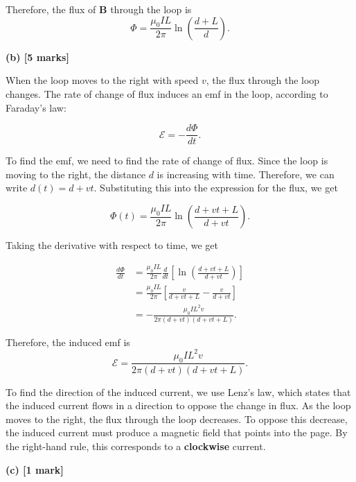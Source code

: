 \documentclass{article}
\begin{document}
Therefore, the flux of $\mathbf{B}$ through the loop is 
\begin{equation*}
\boxed{\Phi = \frac{\mu_0 I L}{2 \pi} \ln \left( \frac{d+L}{d} \right)}.
\end{equation*}

\textbf{(b) [5 marks]}

When the loop moves to the right with speed $v$, the flux through the loop changes.  The rate of change of flux induces an emf in the loop, according to Faraday's law:

\begin{equation*}
\mathcal{E} = -\frac{d\Phi}{dt}.
\end{equation*}

To find the emf, we need to find the rate of change of flux. Since the loop is moving to the right, the distance $d$ is increasing with time. Therefore, we can write $d(t) = d + vt$.  Substituting this into the expression for the flux, we get

\begin{equation*}
\Phi(t) = \frac{\mu_0 I L}{2 \pi} \ln \left( \frac{d + vt + L}{d + vt} \right).
\end{equation*}

Taking the derivative with respect to time, we get

\begin{align*}
\frac{d\Phi}{dt} &= \frac{\mu_0 I L}{2 \pi} \frac{d}{dt} \left[ \ln \left( \frac{d + vt + L}{d + vt} \right) \right] \\
&= \frac{\mu_0 I L}{2 \pi} \left[ \frac{v}{d + vt + L} - \frac{v}{d + vt} \right] \\
&= -\frac{\mu_0 I L^2 v}{2 \pi (d + vt)(d + vt + L)}.
\end{align*}

Therefore, the induced emf is
\begin{equation*}
\mathcal{E} = \boxed{\frac{\mu_0 I L^2 v}{2 \pi (d + vt)(d + vt + L)}}.
\end{equation*}

To find the direction of the induced current, we use Lenz's law, which states that the induced current flows in a direction to oppose the change in flux. As the loop moves to the right, the flux through the loop decreases. To oppose this decrease, the induced current must produce a magnetic field that points into the page. By the right-hand rule, this corresponds to a \textbf{clockwise} current.


\textbf{(c) [1 mark]}
\end{document}
